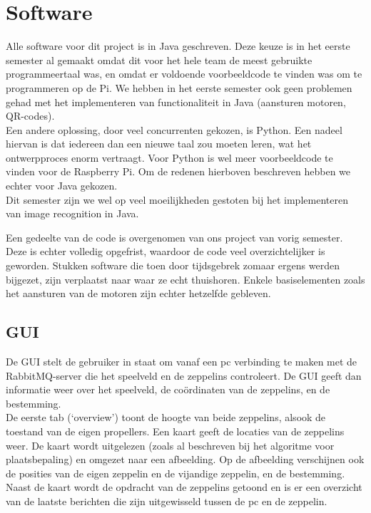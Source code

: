 \documentclass[eind]{penoverslag}
\begin{document}
\section{Software}

Alle software voor dit project is in Java geschreven. Deze keuze is in het eerste semester al gemaakt omdat dit voor het hele team de meest gebruikte programmeertaal was, en omdat er voldoende voorbeeldcode te vinden was om te programmeren op de Pi. We hebben in het eerste semester ook geen problemen gehad met het implementeren van functionaliteit in Java (aansturen motoren, QR-codes). \\
Een andere oplossing, door veel concurrenten gekozen, is Python. Een nadeel hiervan is dat iedereen dan een nieuwe taal zou moeten leren, wat het ontwerpproces enorm vertraagt. Voor Python is wel meer voorbeeldcode te vinden voor de Raspberry Pi. Om de redenen hierboven beschreven hebben we echter voor Java gekozen. \\ 
Dit semester zijn we wel op veel moeilijkheden gestoten bij het implementeren van image recognition in Java.

Een gedeelte van de code is overgenomen van ons project van vorig semester. Deze is echter volledig opgefrist, waardoor de code veel overzichtelijker is geworden. Stukken software die toen door tijdsgebrek zomaar ergens werden bijgezet, zijn verplaatst naar waar ze echt thuishoren. Enkele basiselementen zoals het aansturen van de motoren zijn echter hetzelfde gebleven.\\

\subsection{GUI}
De GUI stelt de gebruiker in staat om vanaf een pc verbinding te maken met de RabbitMQ-server die het speelveld en de zeppelins controleert. De GUI geeft dan informatie weer over het speelveld, de co\"{o}rdinaten van de zeppelins, en de bestemming. \\


De eerste tab (`overview') toont de hoogte van beide zeppelins, alsook de toestand van de eigen propellers. Een kaart geeft de locaties van de zeppelins weer. De kaart wordt uitgelezen (zoals al beschreven bij het algoritme voor plaatsbepaling) en omgezet naar een afbeelding. Op de afbeelding verschijnen ook de posities van de eigen zeppelin en de vijandige zeppelin, en de bestemming. Naast de kaart wordt de opdracht van de zeppelins getoond en is er een overzicht van de laatste berichten die zijn uitgewisseld tussen de pc en de zeppelin. \\
\end{document}
